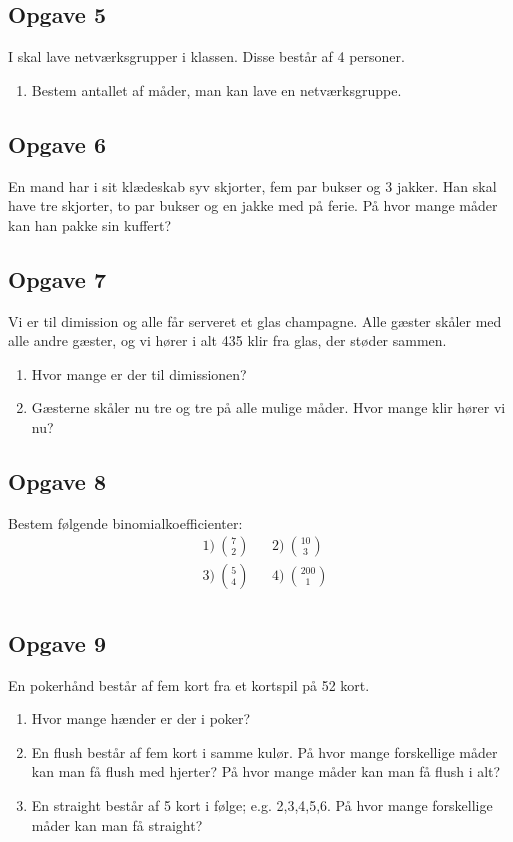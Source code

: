 \subsection*{Opgave 5}
I skal lave netværksgrupper i klassen. Disse består af 4 personer.
\begin{enumerate}[label=\roman*)]
	\item Bestem antallet af måder, man kan lave en netværksgruppe. 
\end{enumerate}


\subsection*{Opgave 6}
En mand har i sit klædeskab syv skjorter, fem par bukser og 3 jakker. Han skal have tre skjorter, to par bukser og en jakke med på ferie. På hvor mange måder kan han pakke sin kuffert?

\subsection*{Opgave 7}
Vi er til dimission og alle får serveret et glas champagne. Alle gæster skåler med alle andre gæster, og vi hører i alt 435 klir fra glas, der støder sammen.
\begin{enumerate}[label=\roman*)]
	\item Hvor mange er der til dimissionen?
	\item Gæsterne skåler nu tre og tre på alle mulige måder. Hvor mange klir hører vi nu?
\end{enumerate}


\subsection*{Opgave 8}
Bestem følgende binomialkoefficienter:
\begin{align*}
&1) \ \binom{7}{2}  &&2) \ \binom{10}{3}  \\
&3) \ \binom{5}{4}  &&4) \ \binom{200}{1}   \\
\end{align*}

\subsection*{Opgave 9}
En pokerhånd består af fem kort fra et kortspil på 52 kort.
\begin{enumerate}[label=\roman*)]
\item Hvor mange hænder er der i poker?
\item En flush består af fem kort i samme kulør. På hvor mange forskellige måder kan man få flush med hjerter? På hvor mange måder kan man få flush i alt?
\item En straight består af 5 kort i følge; e.g. 2,3,4,5,6. På hvor mange forskellige måder kan man få straight?
\end{enumerate} 

